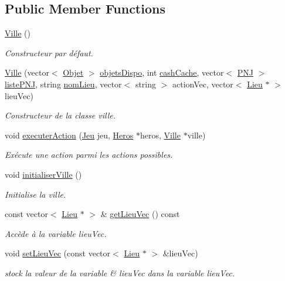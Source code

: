 \subsection*{Public Member Functions}
\begin{DoxyCompactItemize}
\item 
\hyperlink{class_ville_a19a413ad16568980b527b5047399c585}{Ville} ()
\begin{DoxyCompactList}\small\item\em Constructeur par défaut. \end{DoxyCompactList}\item 
\hyperlink{class_ville_a0d8ae3c8e779b5918fe4c76095ffa73d}{Ville} (vector$<$ \hyperlink{class_objet}{Objet} $>$ \hyperlink{class_lieu_a3a65fbb8ecba3f2e265905730ad2e631}{objets\-Dispo}, int \hyperlink{class_lieu_a90b76b521f92a43626ccd29ed5a29f89}{cash\-Cache}, vector$<$ \hyperlink{class_p_n_j}{P\-N\-J} $>$ \hyperlink{class_lieu_a8c1e20b105f7972f22d8f16651de4ebd}{liste\-P\-N\-J}, string \hyperlink{class_lieu_a1e48889fe5c581f043b8bd77ca497fc7}{nom\-Lieu}, vector$<$ string $>$ action\-Vec, vector$<$ \hyperlink{class_lieu}{Lieu} $\ast$ $>$ lieu\-Vec)
\begin{DoxyCompactList}\small\item\em Constructeur de la classe ville. \end{DoxyCompactList}\item 
void \hyperlink{class_ville_a7bfe737f37ec9a99bc1e809047ca0e2e}{executer\-Action} (\hyperlink{class_jeu}{Jeu} jeu, \hyperlink{class_heros}{Heros} $\ast$heros, \hyperlink{class_ville}{Ville} $\ast$ville)
\begin{DoxyCompactList}\small\item\em Exécute une action parmi les actions possibles. \end{DoxyCompactList}\item 
void \hyperlink{class_ville_a533804907c678efb9a4e6f6dd0edac58}{initialiser\-Ville} ()
\begin{DoxyCompactList}\small\item\em Initialise la ville. \end{DoxyCompactList}\item 
const vector$<$ \hyperlink{class_lieu}{Lieu} $\ast$ $>$ \& \hyperlink{class_ville_a2a778c77b3c4d60b414807bc350e10ec}{get\-Lieu\-Vec} () const 
\begin{DoxyCompactList}\small\item\em Accède à la variable lieu\-Vec. \end{DoxyCompactList}\item 
void \hyperlink{class_ville_a64a43e83e7666ca2b157aea711b3bd2f}{set\-Lieu\-Vec} (const vector$<$ \hyperlink{class_lieu}{Lieu} $\ast$ $>$ \&lieu\-Vec)
\begin{DoxyCompactList}\small\item\em stock la valeur de la variable \& lieu\-Vec dans la variable lieu\-Vec. \end{DoxyCompactList}\end{DoxyCompactItemize}
